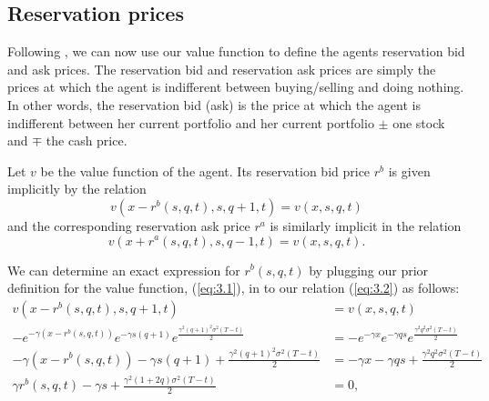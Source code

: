 \subsection*{Reservation prices}

Following \cite{AS2008}, we can now use our value function to define the agents 
reservation bid and ask prices.
The reservation bid and reservation ask prices are simply the prices at which the agent
is indifferent between buying/selling and doing nothing. In other words, the reservation
bid (ask) is the price at which the agent is indifferent between her current portfolio
and her current portfolio $\pm$ one stock and $\mp$ the cash price.

\begin{definition}
    Let $v$ be the value function of the agent. Its reservation bid price $r^b$ is
    given implicitly by the relation
    \begin{equation}\label{eq:3.2}
        v(x-r^b(s,q,t),s,q+1,t)=v(x,s,q,t)
    \end{equation}
    and the corresponding reservation ask price $r^a$ is similarly implicit in the 
    relation
    \begin{equation}\label{eq:3.3}
        v(x+r^a(s,q,t),s,q-1,t)=v(x,s,q,t).
    \end{equation}
\end{definition}

We can determine an exact expression for $r^b(s,q,t)$ by plugging our prior definition
for the value function, (\ref{eq:3.1}), in to our relation (\ref{eq:3.2}) as follows:
\begin{align*}
    v(x-r^b(s,q,t),s,q+1,t)&=v(x,s,q,t)\\
    -e^{-\gamma(x-r^b(s,q,t))}e^{-\gamma s(q+1)}e^{\frac{\gamma^2(q+1)^2\sigma^2(T-t)}{2}}&=-e^{-\gamma x}e^{-\gamma q s}e^{\frac{\gamma^2q^2\sigma^2(T-t)}{2}}\\
    -\gamma(x-r^b(s,q,t))-\gamma s(q+1) + \frac{\gamma^2(q+1)^2\sigma^2(T-t)}{2} &= -\gamma x-\gamma q s + \frac{\gamma^2q^2\sigma^2(T-t)}{2}\\
    \gamma r^b(s,q,t)-\gamma s + \frac{\gamma^2(1+2q)\sigma^2(T-t)}{2} &=0,
\end{align*}

